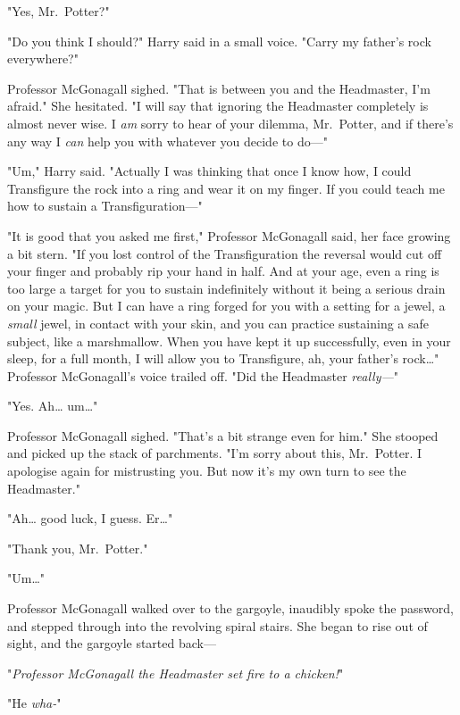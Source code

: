 "Yes, Mr.~Potter?"

"Do you think I should?" Harry said in a small voice. "Carry my father's rock 
everywhere?"

Professor McGonagall sighed. "That is between you and the Headmaster, I'm 
afraid." She hesitated. "I will say that ignoring the Headmaster completely is 
almost never wise. I \emph{am} sorry to hear of your dilemma, Mr.~Potter, and 
if there's any way I \emph{can} help you with whatever you decide to do---"

"Um," Harry said. "Actually I was thinking that once I know how, I could 
Transfigure the rock into a ring and wear it on my finger. If you could teach 
me how to sustain a Transfiguration---"

"It is good that you asked me first," Professor McGonagall said, her face 
growing a bit stern. "If you lost control of the Transfiguration the reversal 
would cut off your finger and probably rip your hand in half. And at your age, 
even a ring is too large a target for you to sustain indefinitely without it 
being a serious drain on your magic. But I can have a ring forged for you with 
a setting for a jewel, a \emph{small} jewel, in contact with your skin, and you 
can practice sustaining a safe subject, like a marshmallow. When you have kept 
it up successfully, even in your sleep, for a full month, I will allow you to 
Transfigure, ah, your father's rock{\ldots}" Professor McGonagall's voice 
trailed off. "Did the Headmaster \emph{really---}"

"Yes. Ah{\ldots} um{\ldots}"

Professor McGonagall sighed. "That's a bit strange even for him." She stooped 
and picked up the stack of parchments. "I'm sorry about this, Mr.~Potter. I 
apologise again for mistrusting you. But now it's my own turn to see the 
Headmaster."

"Ah{\ldots} good luck, I guess. Er{\ldots}"

"Thank you, Mr.~Potter."

"Um{\ldots}"

Professor McGonagall walked over to the gargoyle, inaudibly spoke the password, 
and stepped through into the revolving spiral stairs. She began to rise out of 
sight, and the gargoyle started back---

"\emph{Professor McGonagall the Headmaster set fire to a chicken!}"

"He \emph{wha-}"
